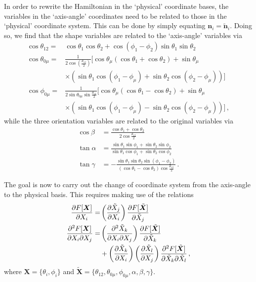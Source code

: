 \documentclass[reprint,superscriptaddress,pra,nofootinbib,preprintnumbers,floatfix]{revtex4-1}
\begin{document}
In order to rewrite the Hamiltonian in the `physical' coordinate bases, the variables in the `axis-angle' coordinates need to be related to those in the `physical' coordinate system. 
%
This can be done by simply equating $\bm n_i =\tilde{\bm  n}_i$. 
%
Doing so, we find that the shape variables are related to the `axis-angle' variables via
%
\begin{align}
\cos \theta_{12} = &\cos \theta_1 \cos \theta_2 + \cos\left(\phi_1 - \phi_2\right) \sin \theta_1 \sin \theta_2 \nonumber \\
\cos \theta_{0\mu}=&\frac{1}{2\cos \left(\frac{\theta_{12}}{2}\right)} \big[ \cos \theta_{\mu} (\cos \theta_1+\cos\theta_2)+\sin \theta_{\mu}\nonumber\\
& \times \left(\sin \theta_1 \cos (\phi_1-\phi_{\mu})+\sin \theta_2 \cos (\phi_2-\phi_{\mu})\right)\big]\nonumber \\
\cos \phi_{0\mu}=&\frac{1}{2 \sin \theta_{0\mu}\sin \frac{\theta_{12}}{2}}\big[\cos \theta_{\mu}\left(\cos \theta_1-\cos \theta_2\right)+ \sin \theta_{\mu}\nonumber\\
& \times \left(\sin \theta_1 \cos (\phi_1 - \phi_{\mu})-\sin \theta_2 \cos (\phi_2 - \phi_{\mu})\right)\big]
\,,
\end{align}
%
while the three orientation variables are related to the original variables via
%
\begin{align}
\cos \beta &=\frac{\cos \theta_1 + \cos \theta_2}{2 \cos \frac{\theta_{12}}{2}}\nonumber \\
\tan \alpha &= \frac{\sin \theta_1 \sin \phi_1+ \sin \theta_2 \sin \phi_2}{\sin \theta_1 \cos \phi_1 + \sin \theta_2 \cos \phi_2} \nonumber \\
\tan \gamma &= -\frac{\sin \theta_1 \sin \theta_2 \sin (\phi_1 - \phi_2)}{\left(\cos \theta_1- \cos \theta_2\right)\cos \frac{\theta_{12}}{2}}
\,.
\end{align}

The goal is now to carry out the change of coordinate system from the axis-angle to the physical basis. 
%
This requires making use of the relations
%
\begin{align}
\pdv{F[\bm X]}{X_i} =&\left(\pdv{\tilde X_j}{X_i}\right)\pdv{F[\tilde{\bm X}]}{\tilde X_j} \nonumber \\
\pdv{F[\bm X]}{X_i}{X_j} =&\left(\pdv{\tilde X_k}{X_i}{X_j}\right) \pdv{F[\tilde{\bm X}]}{\tilde X_k}\nonumber \\
&+\left(\pdv{\tilde X_k}{X_i}\right)\left(\pdv{\tilde X_l}{X_j}\right)\pdv{F[\tilde{\bm X}]}{\tilde X_k}{\tilde X_l}
\,,
\end{align}
%
where $\bm X = \{\theta_i, \phi_i\}$ and $\tilde{\bm X} = \{\theta_{12}, \theta_{0\mu}, \phi_{0\mu}, \alpha, \beta, \gamma\}$.
\end{document}
